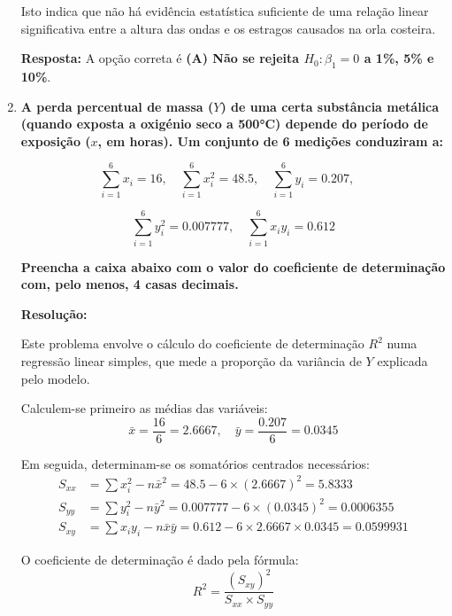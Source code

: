 \documentclass[a4paper,12pt]{article}
\begin{document}
\begin{enumerate}
\begin{mdframed}[backgroundcolor=gray!10,linewidth=0pt,innertopmargin=10pt,innerbottommargin=10pt]
    Isto indica que não há evidência estatística suficiente de uma relação linear significativa entre a altura das ondas e os estragos causados na orla costeira.

    \textbf{Resposta:} A opção correta é \textbf{(A) Não se rejeita $H_0 : \beta_1 = 0$ a 1\%, 5\% e 10\%}.
    \end{mdframed}

    \vspace{0.5cm}

    \item \textbf{A perda percentual de massa (\(Y\)) de uma certa substância metálica (quando exposta a oxigénio seco a 500°C) depende do período de exposição (\(x\), em horas). Um conjunto de 6 medições conduziram a:}

    \[
    \sum_{i=1}^6 x_i = 16,\quad 
    \sum_{i=1}^6 x_i^2 = 48.5,\quad 
    \sum_{i=1}^6 y_i = 0.207,\quad 
    \]

    \[
    \sum_{i=1}^6 y_i^2 = 0.007777,\quad 
    \sum_{i=1}^6 x_i y_i = 0.612
    \]

    \textbf{Preencha a caixa abaixo com o valor do coeficiente de determinação com, pelo menos, 4 casas decimais.}

    \vspace{0.3cm}

    \begin{mdframed}[backgroundcolor=gray!10,linewidth=0pt,innertopmargin=10pt,innerbottommargin=10pt]
    \textbf{Resolução:}

    Este problema envolve o cálculo do coeficiente de determinação $R^2$ numa regressão linear simples, que mede a proporção da variância de $Y$ explicada pelo modelo.

    Calculem-se primeiro as médias das variáveis:
    \[
    \bar{x} = \frac{16}{6} = 2.6667, \quad \bar{y} = \frac{0.207}{6} = 0.0345
    \]

    Em seguida, determinam-se os somatórios centrados necessários:
    \begin{align*}
    S_{xx} &= \sum x_i^2 - n\bar{x}^2 = 48.5 - 6 \times (2.6667)^2 = 5.8333 \\
    S_{yy} &= \sum y_i^2 - n\bar{y}^2 = 0.007777 - 6 \times (0.0345)^2 = 0.0006355 \\
    S_{xy} &= \sum x_i y_i - n\bar{x}\bar{y} = 0.612 - 6 \times 2.6667 \times 0.0345 = 0.0599931
    \end{align*}

    O coeficiente de determinação é dado pela fórmula:
    \[
    R^2 = \frac{(S_{xy})^2}{S_{xx} \times S_{yy}}
    \]


\end{mdframed}
\end{enumerate}
\end{document}
